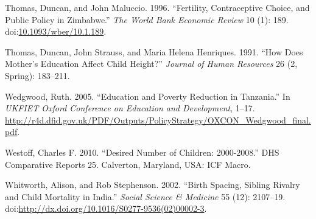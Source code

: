 \documentclass[]{article}
\begin{document}
\hypertarget{ref-Thomas1996}{}
Thomas, Duncan, and John Maluccio. 1996. ``Fertility, Contraceptive Choice, and Public Policy in Zimbabwe.'' \emph{The World Bank Economic Review} 10 (1): 189. doi:\href{https://doi.org/10.1093/wber/10.1.189}{10.1093/wber/10.1.189}.

\hypertarget{ref-Thomas1991}{}
Thomas, Duncan, John Strauss, and Maria Helena Henriques. 1991. ``How Does Mother's Education Affect Child Height?'' \emph{Journal of Human Resources} 26 (2, Spring): 183--211.

\hypertarget{ref-Wedgwood2005}{}
Wedgwood, Ruth. 2005. ``Education and Poverty Reduction in Tanzania.'' In \emph{UKFIET Oxford Conference on Education and Development}, 1--17. \url{http://r4d.dfid.gov.uk/PDF/Outputs/PolicyStrategy/OXCON_Wedgwood_final.pdf}.

\hypertarget{ref-Westoff2010}{}
Westoff, Charles F. 2010. ``Desired Number of Children: 2000-2008.'' DHS Comparative Reports 25. Calverton, Maryland, USA: ICF Macro.

\hypertarget{ref-Whitworth2002}{}
Whitworth, Alison, and Rob Stephenson. 2002. ``Birth Spacing, Sibling Rivalry and Child Mortality in India.'' \emph{Social Science \& Medicine} 55 (12): 2107--19. doi:\href{https://doi.org/http://dx.doi.org/10.1016/S0277-9536(02)00002-3}{http://dx.doi.org/10.1016/S0277-9536(02)00002-3}.
\end{document}
